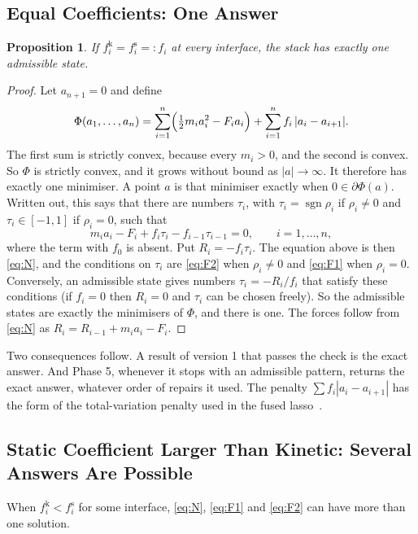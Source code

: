 \documentclass[11pt,a4paper]{article}
\newtheorem{proposition}{Proposition}
\newcommand{\fs}{f^{\mathrm{s}}}
\newcommand{\fkin}{f^{\mathrm{k}}}
\DeclareMathOperator{\sgn}{sgn}
\begin{document}
\subsection{Equal Coefficients: One Answer}\label{sec:equal}

\begin{proposition}\label{prop:unique}
If $\fkin_i=\fs_i=:f_i$ at every interface, the stack has exactly one admissible state.
\end{proposition}

\begin{proof}
Let $a_{n+1}=0$ and define
\[
\Phi(a_1,\dots,a_n)=\sum_{i=1}^{n}\Bigl(\tfrac12 m_ia_i^{2}-F_ia_i\Bigr)+\sum_{i=1}^{n}f_i\,|a_i-a_{i+1}| .
\]
The first sum is strictly convex, because every $m_i>0$, and the second is convex. So $\Phi$ is strictly convex, and it grows without bound as $|a|\to\infty$. It therefore has exactly one minimiser. A point $a$ is that minimiser exactly when $0\in\partial\Phi(a)$. Written out, this says that there are numbers $\tau_i$, with $\tau_i=\sgn\rho_i$ if $\rho_i\ne0$ and $\tau_i\in[-1,1]$ if $\rho_i=0$, such that
\[
m_ia_i-F_i+f_i\tau_i-f_{i-1}\tau_{i-1}=0,\qquad i=1,\dots,n,
\]
where the term with $f_0$ is absent. Put $R_i=-f_i\tau_i$. The equation above is then \eqref{eq:N}, and the conditions on $\tau_i$ are \eqref{eq:F2} when $\rho_i\ne0$ and \eqref{eq:F1} when $\rho_i=0$. Conversely, an admissible state gives numbers $\tau_i=-R_i/f_i$ that satisfy these conditions (if $f_i=0$ then $R_i=0$ and $\tau_i$ can be chosen freely). So the admissible states are exactly the minimisers of $\Phi$, and there is one. The forces follow from \eqref{eq:N} as $R_i=R_{i-1}+m_ia_i-F_i$.
\end{proof}

Two consequences follow. A result of version 1 that passes the check is the exact answer. And Phase 5, whenever it stops with an admissible pattern, returns the exact answer, whatever order of repairs it used. The penalty $\sum f_i|a_i-a_{i+1}|$ has the form of the total-variation penalty used in the fused lasso~\cite{fused}.

\subsection{Static Coefficient Larger Than Kinetic: Several Answers Are Possible}\label{sec:several}

When $\fkin_i<\fs_i$ for some interface, \eqref{eq:N}, \eqref{eq:F1} and \eqref{eq:F2} can have more than one solution.
\end{document}
